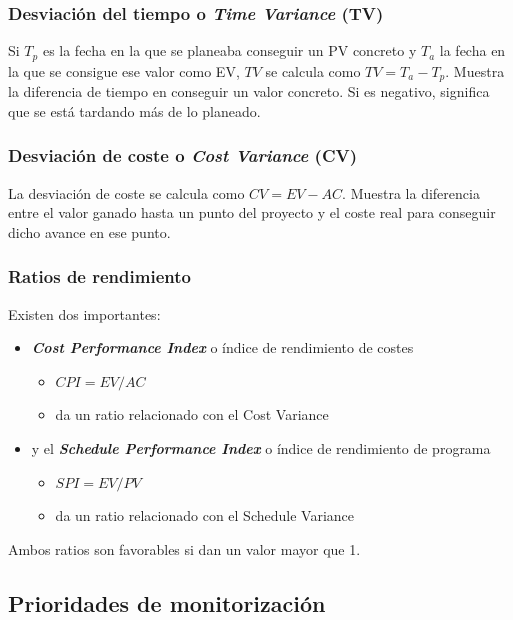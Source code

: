 \documentclass[12pt]{article}
\begin{document}
\subsubsection{Desviación del tiempo o \textit{Time Variance} (TV)}
\label{9.6.4}

{Si $T_p$ es la fecha en la que se planeaba conseguir un PV concreto y $T_a$ la fecha en la que se consigue ese valor como EV, $TV$ se calcula como $TV = T_a - T_p$. Muestra la diferencia de tiempo en conseguir un valor concreto. Si es negativo, significa que se está tardando más de lo planeado.}

\subsubsection{Desviación de coste o \textit{Cost Variance} (CV)}
\label{9.6.5}

{La desviación de coste se calcula como $CV = EV - AC$. Muestra la diferencia entre el valor ganado hasta un punto del proyecto y el coste real para conseguir dicho avance en ese punto.}

\subsubsection{Ratios de rendimiento}
\label{9.6.6}

{Existen dos importantes:}

\begin{itemize}
    \item {\textbf{\textit{Cost Performance Index}} o índice de rendimiento de costes}
    \begin{itemize}
        \item $CPI=EV/AC$
        \item da un ratio relacionado con el Cost Variance
    \end{itemize}
    
    \item {y el \textbf{\textit{Schedule Performance Index}} o índice de rendimiento de programa }
    \begin{itemize}
        \item $SPI=EV/PV$
        \item da un ratio relacionado con el Schedule Variance
    \end{itemize}
\end{itemize}

{Ambos ratios son favorables si dan un valor mayor que 1.}

\subsection{Prioridades de monitorización}
\label{9.7.0}
\end{document}
